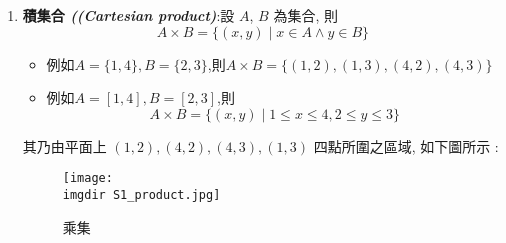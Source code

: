 \begin{enumerate}
{		 由上述定義可以證得 : $( (x, y) = (a, b) \Leftrightarrow x = a, y = b )$.
		 }
		 \item {\textbf{積集合   \emph{ ((Cartesian product)}}:設 $A$, $B$ 為集合, 則
		 $$ A \times B = \{ (x,y) \mid x \in A \wedge y \in B \} $$
		 \begin{itemize}
		 	\item 例如$ A=\{1,4\},B=\{2,3\} $,則$ A \times B = \{(1,2),(1,3),(4,2),(4,3) \} $
		 	\item 例如$ A=[1,4],B=[2,3] $,則
		 	$$ A \times B = \{ (x,y) \mid 1 \leq x \leq 4 , 2 \leq y \leq3\} $$		 	
		 \end{itemize}
		其乃由平面上 $(1, 2), (4, 2), (4, 3), (1, 3)$ 四點所圍之區域, 如下圖所示 :		
		 	\begin{figure}[H]	
		 	 \centering	 			 	 
   			 \texttt{[image: \\imgdir S1\_product.jpg]} 
   			 \caption{乘集}   		
   			 \label{set:product}   			 		 
		 \end{figure}
		 }
		\end{enumerate}		
	\bigskip	
